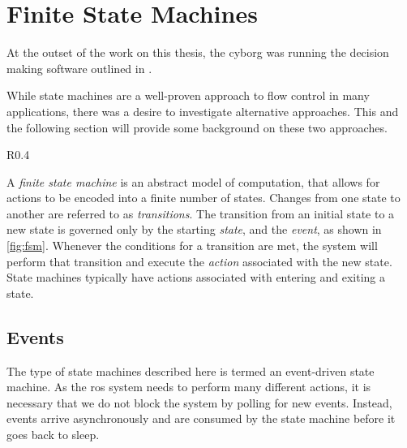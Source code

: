 \documentclass[\rootfolder/main.tex]{subfiles}
\begin{document}
\section{Finite State Machines}

At the outset of the work on this thesis, the cyborg was running the decision making software outlined in \cite{Andersen2017}.

While state machines are a well-proven approach to flow control in many applications, there was a desire to investigate alternative approaches.
This and the following section will provide some background on these two approaches.

\begin{wrapfigure}{R}{0.4\columnwidth}
    \caption{An example of a simple state machine.}
    \label{fig:fsm}
\end{wrapfigure}

A \emph{finite state machine} is an abstract model of computation, that allows for actions to be encoded into a finite number of states.
Changes from one state to another are referred to as \emph{transitions}.
The transition from an initial state to a new state is governed only by the starting \emph{state}, and the \emph{event}, as shown in \cref{fig:fsm}.
Whenever the conditions for a transition are met, the system will perform that transition and execute the \emph{action} associated with the new state.
State machines typically have actions associated with entering and exiting a state.


\subsection{Events}

The type of state machines described here is termed an event-driven state machine.
As the \acrshort{ros} system needs to perform many different actions, it is necessary that we do not block the system by polling for new events.
Instead, events arrive asynchronously and are consumed by the state machine before it goes back to sleep.

\end{document}
